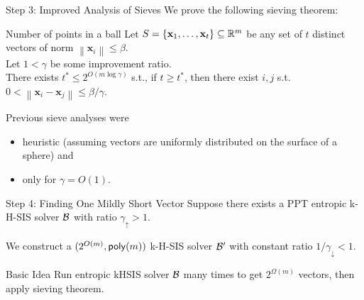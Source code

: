 \documentclass[xcolor=table,10pt,aspectratio=169]{beamer}
\renewcommand{\vec}[1]{\ensuremath{\mathbf{#1}}\xspace}
\newcommand{\norm}[1]{\left\lVert#1\right\rVert}
\newcommand{\growthfactor}{\gamma_{\uparrow}}
\newcommand{\shrinkfactor}{\gamma_{\downarrow}}
\newcommand{\combinedfactor}{\gamma}
\begin{document}
\begin{frame}[label={sec:org4188a90}]{Step 3: Improved Analysis of Sieves}
We prove the following sieving theorem:

\begin{alertblock}{Number of points in a ball}
Let \(S = \set{\vec{x}_1, \ldots, \vec{x}_t} \subseteq \RR^m\) be any set of \(t\) distinct vectors of norm \(\norm{\vec{x}_i} \leq \beta\).\\[0pt]
Let \(1 < \combinedfactor\) be some improvement ratio.\\[0pt]
There exists \(t^* \leq 2^{O(m \log \combinedfactor)}\) s.t., if \(t \geq t^*\), then there exist \(i,j\) s.t. \(0 < \norm{\vec{x}_i - \vec{x}_j} \leq \beta/\combinedfactor\).
\end{alertblock}

Previous sieve analyses were
\begin{itemize}
\item heuristic (assuming vectors are uniformly distributed on the surface of a sphere) and
\item only for \(\combinedfactor = O(1)\).
\end{itemize}
\end{frame}

\begin{frame}[label={sec:org105ca1e}]{Step 4: Finding One Mildly Short Vector}
Suppose there exists a PPT entropic k-H-SIS solver \(\mathcal{B}\) with ratio \(\growthfactor > 1\).

We construct a \((2^{O(m)},\poly[m])\) k-H-SIS solver \(\mathcal{B}'\) with constant ratio \(1/\shrinkfactor < 1\).

\begin{alertblock}{Basic Idea}
Run entropic kHSIS solver \(\mathcal{B}\) many times to get \(2^{\Omega(m)}\) vectors, then apply sieving theorem.
\end{alertblock}
\end{frame}
\end{document}
